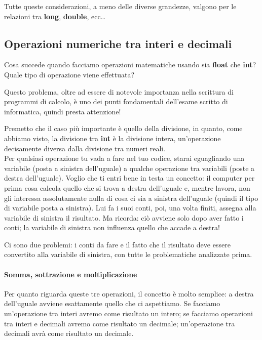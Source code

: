 	Tutte queste considerazioni, a meno delle diverse grandezze, valgono per le relazioni tra \textbf{long}, \textbf{double}, ecc\ldots
	
	\subsection{Operazioni numeriche tra interi e decimali}
	Cosa succede quando facciamo operazioni matematiche usando sia \textbf{float} che \textbf{int}? Quale tipo di operazione viene effettuata?
	
	Questo problema, oltre ad essere di notevole importanza nella scrittura di programmi di calcolo, è uno dei punti fondamentali dell'esame scritto di informatica, quindi presta attenzione!
	
	Premetto che il caso più importante è quello della divisione, in quanto, come abbiamo visto, la divisione tra \textbf{int} è la divisione intera, un'operazione decisamente diversa dalla divisione tra numeri reali.
	\\
	
	Per qualsiasi operazione tu vada a fare nel tuo codice, starai eguagliando una variabile (posta a sinistra dell'uguale) a qualche operazione tra variabili (poste a destra dell'uguale). Voglio che ti entri bene in testa un concetto: il computer per prima cosa calcola quello che si trova a destra dell'uguale e, mentre lavora, non gli interessa assolutamente nulla di cosa ci sia a sinistra dell'uguale (quindi il tipo di variabile posta a sinistra). Lui fa i suoi conti, poi, una volta finiti, assegna alla variabile di sinistra il risultato. Ma ricorda: ciò avviene solo dopo aver fatto i conti; la variabile di sinistra non influenza quello che accade a destra!
	
	Ci sono due problemi: i conti da fare e il fatto che il risultato deve essere convertito alla variabile di sinistra, con tutte le problematiche analizzate prima. 
	
	\paragraph{Somma, sottrazione e moltiplicazione} Per quanto riguarda queste tre operazioni, il concetto è molto semplice: a destra dell'uguale avviene esattamente quello che ci aspettiamo. Se facciamo un'operazione tra interi avremo come risultato un intero; se facciamo operazioni tra interi e decimali avremo come risultato un decimale; un'operazione tra decimali avrà come risultato un decimale. 
	
